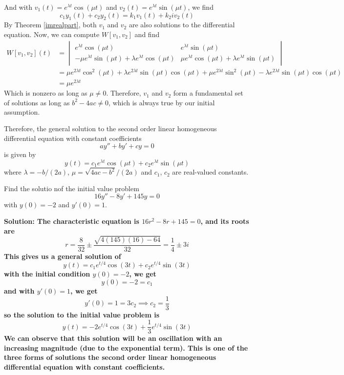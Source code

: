 And with $v_1(t) = e^{\lambda t}\cos (\mu t)$ and $v_2(t) = e^{\lambda t}\sin (\mu t)$, we find
\[ c_1y_1(t) + c_2y_2(t) = k_1v_1(t) + k_2iv_2(t) \]
By Theorem \ref{imrealpart}, both $v_1$ and $v_2$ are also solutions to the differential equation. Now, we can compute $W[v_1, v_2]$ and find
\begin{align*}
    W[v_1, v_2](t) &= \begin{vmatrix}
    e^{\lambda t}\cos (\mu t) & e^{\lambda t}\sin (\mu t) \\
    -\mu e^{\lambda t}\sin(\mu t) + \lambda e^{\lambda t}\cos(\mu t) & \mu e^{\lambda t}\cos(\mu t) + \lambda e^{\lambda t}\sin(\mu t) \end{vmatrix} \\
    &= \mu e^{2\lambda t}\cos^2(\mu t) + \lambda e^{2\lambda t}\sin(\mu t)\cos(\mu t) + \mu e^{2\lambda t}\sin^2(\mu t) - \lambda e^{2\lambda t}\sin(\mu t)\cos(\mu t) \\
    &= \mu e^{2\lambda t}
\end{align*}
Which is nonzero as long as $\mu \neq 0$. Therefore, $v_1$ and $v_2$ form a fundamental set of solutions as long as $b^2-4ac \neq 0$, which is always true by our initial assumption. \par 
Therefore, the general solution to the second order linear homogeneous differential equation with constant coefficients 
\[ ay'' + by' + cy = 0\]
is given by 
\[ y(t) = c_1 e^{\lambda t}\cos(\mu t) + c_2e^{\lambda t}\sin(\mu t) \]
where $\lambda = -b/(2a)$, $\mu = \sqrt{4ac-b^2}/(2a)$ and $c_1$, $c_2$ are real-valued constants.
\begin{example}
    Find the solutio nof the initial value problem
    \[ 16y'' - 8y' + 145y = 0 \]
    with $y(0) = -2$ and $y'(0)=1$. \par
    \bf{Solution:} The characteristic equation is $16r^2-8r+145 = 0$, and its roots are
    \[ r = \frac{8}{32} \pm \frac{\sqrt{4(145)(16)-64}}{32} = \frac{1}{4} \pm 3i \]
    This gives us a general solution of
    \[ y(t) = c_1e^{t/4}\cos(3t) + c_2e^{t/4}\sin(3t) \]
    with the initial condition $y(0)=-2$, we get
    \[ y(0) = -2 = c_1 \]
    and with $y'(0)=1$, we get
    \[ y'(0) = 1 = 3c_2 \implies c_2 = \frac{1}{3}\]
    so the solution to the initial value problem is
    \[ y(t) = -2e^{t/4}\cos(3t) + \frac{1}{3}e^{t/4}\sin(3t) \]
    We can observe that this solution will be an oscillation with an increasing magnitude (due to the exponential term). This is one of the three forms of solutions the second order linear homogeneous differential equation with constant coefficients.
\end{example}
